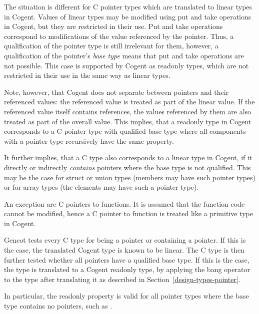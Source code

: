 The situation is different for C pointer types which are translated to linear types in Cogent. Values of linear types
may be modified using put and take operations in Cogent, but they are restricted in their use. Put and take operations
correspond to modifications of the value referenced by the pointer. Thus, a  qualification of the pointer
type is still irrelevant for them, however, a  qualification of the pointer's \textit{base type} means
that put and take operations are not possible. This case is supported by Cogent as readonly types, which are not
restricted in their use in the same way as linear types.

Note, however, that Cogent does not separate between pointers and their referenced values: the referenced value
is treated as part of the linear value. If the referenced value itself contains references, the values referenced
by them are also treated as part of the overall value. This implies, that a readonly type in Cogent corresponds to
a C pointer type with  qualified base type where all components with a pointer type recursively have
the same property.

It further implies, that a C type also corresponds to a linear type in Cogent, if it directly or indirectly 
\textit{contains} pointers where the base type is not  qualified. This may be the case for struct or union
types (members may have such pointer types) or for array types (the elements may have such a pointer type).

An exception are C pointers to functions. It is assumed that the function code cannot be modified, hence a C pointer 
to function is treated like a primitive type in Cogent.

Gencot tests every C type for being a pointer or containing a pointer. If this is the case, the translated Cogent 
type is known to be linear. The C type is then further tested whether all pointers have a  qualified
base type. If this is the case, the type is translated to a Cogent readonly type,
by applying the bang operator \code{!} to the type after translating it as described in Section~\ref{design-types-pointer}.

In particular, the readonly property is valid for all pointer types where the base type contains no pointers, such as
.



